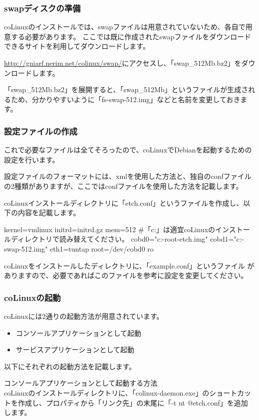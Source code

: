 \documentclass[mingoth,a4paper]{jsarticle}
\begin{document}
\subsubsection{swapディスクの準備}
coLinuxのインストールでは、swapファイルは用意されていないため、各自で用意する必要があります。
ここでは既に作成されたswapファイルをダウンロードできるサイトを利用してダウンロードします。

\url{http://gniarf.nerim.net/colinux/swap/}にアクセスし、「swap\_512Mb.bz2」をダウンロードします。

「swap\_512Mb.bz2」を展開すると、「swap\_512Mb」というファイルが生成され
るため、分かりやすいように「fs-swap-512.img」などと名前を変更しておきま
す。

\subsubsection{設定ファイルの作成}
これで必要なファイルは全てそろったので、coLinuxでDebianを起動するための設定を行います。

設定ファイルのフォーマットには、xmlを使用した方法と、独自のconfファイル
の2種類がありますが、ここではconfファイルを使用した方法を記載します。

coLinuxインストールディレクトリに「etch.conf」というファイルを作成し、以下の内容を記載します。

\begin{commandline}
kernel=vmlinux
initrd=initrd.gz
mem=512
#「c:\coLinux」は適宜coLinuxのインストールディレクトリで読み替えてください。
cobd0="c:\coLinux\fs-root-etch.img"
cobd1="c:\coLinux\fs-swap-512.img"
eth1=tuntap
root=/dev/cobd0
ro
\end{commandline}

coLinuxをインストールしたディレクトリに、「example.conf」というファイル
がありますので、必要であればこのファイルを参考に設定を変更してください。

\subsubsection{coLinuxの起動}
coLinuxには2通りの起動方法が用意されています。
\begin{itemize}
\item コンソールアプリケーションとして起動
\item サービスアプリケーションとして起動
\end{itemize}

以下にそれぞれの起動方法を記載します。

コンソールアプリケーションとして起動する方法\\
coLinuxのインストールディレクトリに、「colinux-daemon.exe」のショートカッ
トを作成し、プロパティから「リンク先」の末尾に「-t nt @etch.conf」を追加
します。
\end{document}

